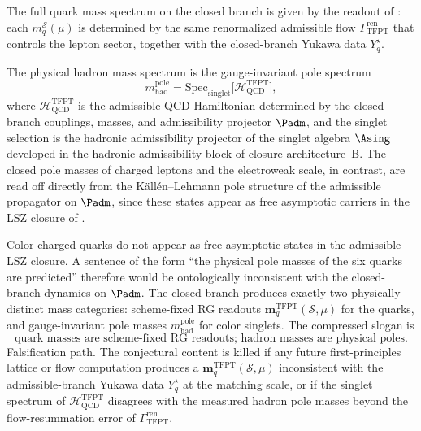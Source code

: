 \begin{conjecture}
\label{thm:closed_pole_mass_completion}
The full quark mass spectrum on the closed branch is given by the readout of
: each $m_q^{\mathcal S}(\mu)$ is determined by the same
renormalized admissible flow $\Gamma_{\mathrm{TFPT}}^{\mathrm{ren}}$ that controls the lepton sector,
together with the closed-branch Yukawa data $Y_q^\star$.
\end{conjecture}

\begin{conjecture}
\label{thm:hadron_pole_masses_singlet_spectrum}
The physical hadron mass spectrum is the gauge-invariant pole spectrum
\[
m_{\mathrm{had}}^{\mathrm{pole}}
=
\mathrm{Spec}_{\mathrm{singlet}}
\bigl[\mathcal H_{\mathrm{QCD}}^{\mathrm{TFPT}}\bigr],
\]
where $\mathcal H_{\mathrm{QCD}}^{\mathrm{TFPT}}$ is the admissible QCD Hamiltonian determined by the
closed-branch couplings, masses, and admissibility projector $\Padm$, and the singlet selection is
the hadronic admissibility projector of the singlet algebra $\Asing$ developed in the hadronic
admissibility block of closure architecture~B. The closed pole
masses of charged leptons and the electroweak scale, in contrast, are read off directly from the
Källén--Lehmann pole structure of the admissible propagator on $\Padm$, since these states appear as
free asymptotic carriers in the LSZ closure of .
\end{conjecture}

\begin{remark}
Color-charged quarks do not appear as free asymptotic states in the admissible LSZ closure. A
sentence of the form ``the physical pole masses of the six quarks are predicted'' therefore would be
ontologically inconsistent with the closed-branch dynamics on $\Padm$. The closed branch produces
exactly two physically distinct mass categories: scheme-fixed RG readouts
$\mathbf m_q^{\mathrm{TFPT}}(\mathcal S,\mu)$ for the quarks, and gauge-invariant pole masses
$m_{\mathrm{had}}^{\mathrm{pole}}$ for color singlets. The compressed slogan is
\[
\boxed{\text{quark masses are scheme-fixed RG readouts; hadron masses are physical poles.}}
\]
Falsification path. The conjectural content is killed if any future first-principles lattice or
flow computation produces a $\mathbf m_q^{\mathrm{TFPT}}(\mathcal S,\mu)$ inconsistent with the
admissible-branch Yukawa data $Y_q^\star$ at the matching scale, or if the singlet spectrum of
$\mathcal H_{\mathrm{QCD}}^{\mathrm{TFPT}}$ disagrees with the measured hadron pole masses beyond the
flow-resummation error of $\Gamma_{\mathrm{TFPT}}^{\mathrm{ren}}$.
\end{remark}

